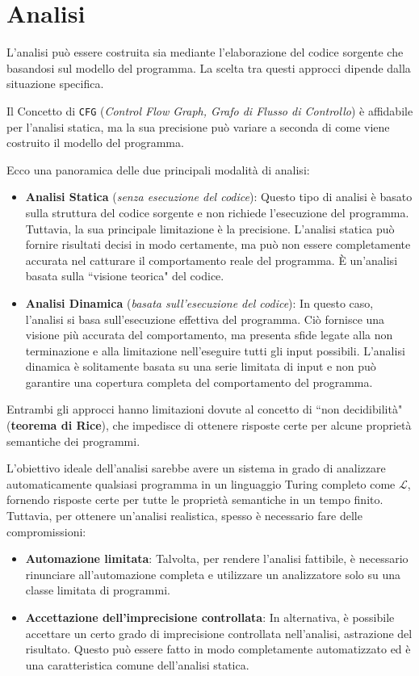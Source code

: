 \chapter{Analisi}
L'analisi può essere costruita sia mediante l'elaborazione del codice sorgente che basandosi 
sul modello del programma. La scelta tra questi approcci dipende dalla situazione specifica.

Il Concetto di \verb|CFG| (\textit{Control Flow Graph, Grafo di Flusso di Controllo}) è affidabile per l'analisi
statica, ma la sua precisione può variare a seconda di come viene costruito il modello del programma.

Ecco una panoramica delle due principali modalità di analisi:
\begin{itemize}
    \item \textbf{Analisi Statica} (\textit{senza esecuzione del codice}): Questo tipo di analisi 
    è basato sulla struttura del codice sorgente e non richiede l'esecuzione del programma. 
    Tuttavia, la sua principale limitazione è la precisione. L'analisi statica può fornire 
    risultati decisi in modo certamente, ma può non essere completamente accurata nel 
    catturare il comportamento reale del programma. È un'analisi basata sulla ``visione teorica" del codice.
    \item \textbf{Analisi Dinamica} (\textit{basata sull'esecuzione del codice}): In questo caso,
    l'analisi si basa sull'esecuzione effettiva del programma. Ciò fornisce una visione più accurata del
    comportamento, ma presenta sfide legate alla non terminazione e alla limitazione nell'eseguire tutti
    gli input possibili. L'analisi dinamica è solitamente basata su una serie
    limitata di input e non può garantire una copertura completa del comportamento del programma.
\end{itemize}
Entrambi gli approcci hanno limitazioni dovute al concetto di ``non decidibilità" (\textbf{teorema di Rice}),
che impedisce di ottenere risposte certe per alcune proprietà semantiche dei programmi.

L'obiettivo ideale dell'analisi sarebbe avere un sistema in grado di analizzare
automaticamente qualsiasi programma in un linguaggio Turing completo come $\mathcal{L}$,
fornendo risposte certe per tutte le proprietà semantiche in un tempo finito.
Tuttavia, per ottenere un'analisi realistica, spesso è necessario fare delle compromissioni:

\begin{itemize}
    \item \textbf{Automazione limitata}: Talvolta, per rendere l'analisi fattibile, è necessario
    rinunciare all'automazione completa e utilizzare un analizzatore solo su una classe limitata di programmi.
    \item \textbf{Accettazione dell'imprecisione controllata}: In alternativa, è possibile accettare un certo
    grado di imprecisione controllata nell'analisi, astrazione del risultato. Questo può essere fatto in modo
    completamente automatizzato ed è una caratteristica comune dell'analisi statica.
\end{itemize}

